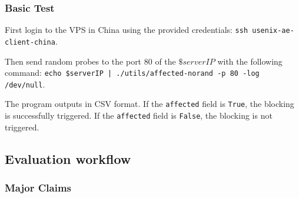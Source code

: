 \subsubsection{Basic Test}

First login to the VPS in China using the provided credentials:
\texttt{ssh usenix-ae-client-china}.

Then send random probes to the port $80$ of the $\$serverIP$ with the following command:
\texttt{echo \$serverIP | ./utils/affected-norand -p 80 -log /dev/null}.

The program outputs in CSV format. 
If the \texttt{affected} field is \texttt{True},
the blocking is successfully triggered.
If the \texttt{affected} field is \texttt{False},
the blocking is not triggered.


\subsection{Evaluation workflow}

\subsubsection{Major Claims}

